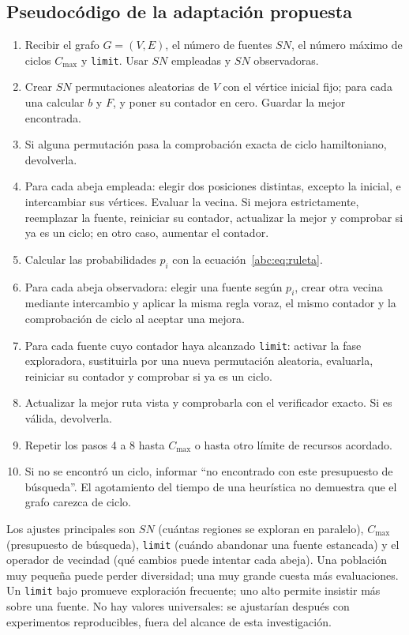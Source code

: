 \subsection{Pseudocódigo de la adaptación propuesta}\label{abc:sec:pseudo}
\begin{enumerate}[leftmargin=*,label=\arabic*.]
\item Recibir el grafo $G=(V,E)$, el número de fuentes $SN$, el número máximo de ciclos $C_{\max}$ y \texttt{limit}. Usar $SN$ empleadas y $SN$ observadoras.
\item Crear $SN$ permutaciones aleatorias de $V$ con el vértice inicial fijo; para cada una calcular $b$ y $F$, y poner su contador en cero. Guardar la mejor encontrada.
\item Si alguna permutación pasa la comprobación exacta de ciclo hamiltoniano, devolverla.
\item Para cada abeja empleada: elegir dos posiciones distintas, excepto la inicial, e intercambiar sus vértices. Evaluar la vecina. Si mejora estrictamente, reemplazar la fuente, reiniciar su contador, actualizar la mejor y comprobar si ya es un ciclo; en otro caso, aumentar el contador.
\item Calcular las probabilidades $p_i$ con la ecuación~\eqref{abc:eq:ruleta}.
\item Para cada abeja observadora: elegir una fuente según $p_i$, crear otra vecina mediante intercambio y aplicar la misma regla voraz, el mismo contador y la comprobación de ciclo al aceptar una mejora.
\item Para cada fuente cuyo contador haya alcanzado \texttt{limit}: activar la fase exploradora, sustituirla por una nueva permutación aleatoria, evaluarla, reiniciar su contador y comprobar si ya es un ciclo.
\item Actualizar la mejor ruta vista y comprobarla con el verificador exacto. Si es válida, devolverla.
\item Repetir los pasos 4 a 8 hasta $C_{\max}$ o hasta otro límite de recursos acordado.
\item Si no se encontró un ciclo, informar ``no encontrado con este presupuesto de búsqueda''. El agotamiento del tiempo de una heurística no demuestra que el grafo carezca de ciclo.
\end{enumerate}

Los ajustes principales son $SN$ (cuántas regiones se exploran en paralelo), $C_{\max}$ (presupuesto de búsqueda), \texttt{limit} (cuándo abandonar una fuente estancada) y el operador de vecindad (qué cambios puede intentar cada abeja). Una población muy pequeña puede perder diversidad; una muy grande cuesta más evaluaciones. Un \texttt{limit} bajo promueve exploración frecuente; uno alto permite insistir más sobre una fuente. No hay valores universales: se ajustarían después con experimentos reproducibles, fuera del alcance de esta investigación.\cite{abc7,abc8}

